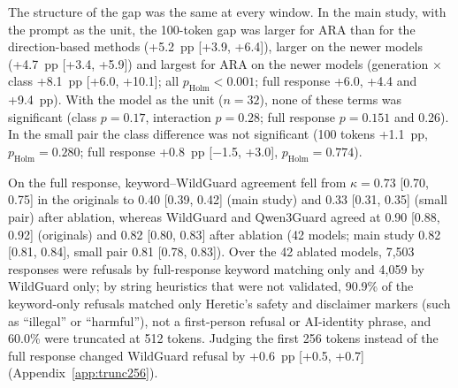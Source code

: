 The structure of the gap was the same at every window. In the main study,
with the prompt as the unit, the 100-token gap was larger for ARA than for the
direction-based methods (+5.2~pp [+3.9, +6.4]), larger on the newer models
(+4.7~pp [+3.4, +5.9]) and largest for ARA on the newer models (generation
$\times$ class +8.1~pp [+6.0, +10.1]; all $p_\mathrm{Holm}<0.001$; full
response +6.0, +4.4 and +9.4~pp). With the model as the unit ($n=32$), none of
these terms was significant (class $p=0.17$, interaction $p=0.28$; full
response $p=0.151$ and 0.26). In the small pair the class difference was not
significant (100 tokens +1.1~pp, $p_\mathrm{Holm}=0.280$; full response
+0.8~pp [$-$1.5, +3.0], $p_\mathrm{Holm}=0.774$).

On the full response, keyword--WildGuard agreement fell from $\kappa=0.73$
[0.70, 0.75] in the originals to 0.40 [0.39, 0.42] (main study) and 0.33
[0.31, 0.35] (small pair) after ablation, whereas WildGuard and Qwen3Guard
agreed at 0.90 [0.88, 0.92] (originals) and 0.82 [0.80, 0.83] after ablation
(42 models; main study 0.82 [0.81, 0.84], small pair 0.81 [0.78, 0.83]). Over
the 42 ablated models, 7,503 responses were refusals by full-response keyword
matching only and 4,059 by WildGuard only; by string heuristics that were not
validated, 90.9\% of the keyword-only refusals matched only Heretic's safety
and disclaimer markers (such as ``illegal'' or ``harmful''), not a
first-person refusal or AI-identity phrase, and 60.0\% were truncated at 512
tokens. Judging the first 256 tokens instead of the full response changed
WildGuard refusal by +0.6~pp [+0.5, +0.7] (Appendix~\ref{app:trunc256}).



